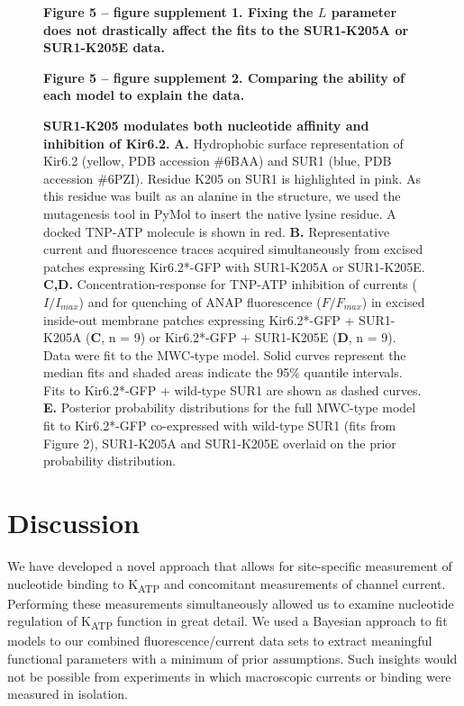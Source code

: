 \documentclass[9pt,lineno, onehalfspacing]{elife_modified}
\begin{document}
\begin{figure}\ContinuedFloat
\begin{fullwidth}
\caption{
\textbf{SUR1-K205 modulates both nucleotide affinity and inhibition of Kir6.2.}
\textbf{A.}
Hydrophobic surface representation of Kir6.2 (yellow, PDB accession \#6BAA) and SUR1 (blue, PDB accession \#6PZI).
Residue K205 on SUR1 is highlighted in pink.
As this residue was built as an alanine in the structure, we used the mutagenesis tool in PyMol to insert the native lysine residue.
A docked TNP-ATP molecule is shown in red.
\textbf{B.}
Representative current and fluorescence traces acquired simultaneously from excised patches expressing Kir6.2*-GFP with SUR1-K205A or SUR1-K205E.
\textbf{C,D.}
Concentration-response for TNP-ATP inhibition of currents ($I/I_{max}$) and for quenching of ANAP fluorescence ($F/F_{max}$) in excised inside-out membrane patches expressing Kir6.2*-GFP + SUR1-K205A (\textbf{C}, n = 9) or Kir6.2*-GFP + SUR1-K205E (\textbf{D}, n = 9).
Data were fit to the MWC-type model.
Solid curves represent the median fits and shaded areas indicate the 95\% quantile intervals.
Fits to Kir6.2*-GFP + wild-type SUR1 are shown as dashed curves.
\textbf{E.}
Posterior probability distributions for the full MWC-type model fit to Kir6.2*-GFP co-expressed with wild-type SUR1 (fits from Figure 2), SUR1-K205A and SUR1-K205E overlaid on the prior probability distribution.
}

\textbf{Figure 5 -- figure supplement 1. Fixing the $L$ parameter does not drastically affect the fits to the SUR1-K205A or SUR1-K205E data.}

\textbf{Figure 5 -- figure supplement 2. Comparing the ability of each model to explain the data. }
\end{fullwidth}
\end{figure}

\section{Discussion}

We have developed a novel approach that allows for site-specific measurement of nucleotide binding to K\textsubscript{ATP} and concomitant measurements of channel current.
Performing these measurements simultaneously allowed us to examine nucleotide regulation of K\textsubscript{ATP} function in great detail.
We used a Bayesian approach to fit models to our combined fluorescence/current data sets to extract meaningful functional parameters with a minimum of prior assumptions.
Such insights would not be possible from experiments in which macroscopic currents or binding were measured in isolation.
\end{document}
